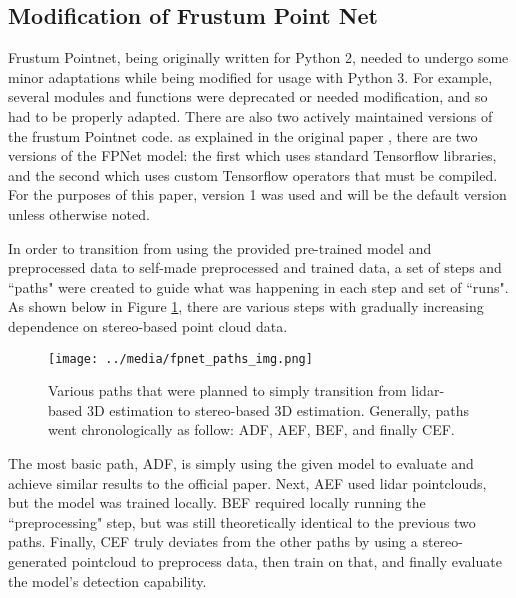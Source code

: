 \subsection{Modification of Frustum Point Net}
Frustum Pointnet, being originally written for Python 2, needed to undergo some minor adaptations while being modified for usage with Python 3. For example, several modules and functions were deprecated or needed modification, and so had to be properly adapted. There are also two actively maintained versions of the frustum Pointnet code. as explained in the original paper \cite{qi_frustum_2017}, there are two versions of the FPNet model: the first which uses standard Tensorflow libraries, and the second which uses custom Tensorflow operators that must be compiled. For the purposes of this paper, version 1 was used and will be the default version unless otherwise noted.

In order to transition from using the provided pre-trained model and preprocessed data to self-made preprocessed and trained data, a set of steps and ``paths" were created to guide what was happening in each step and set of ``runs". As shown below in Figure \ref{fp_paths}, there are various steps with gradually increasing dependence on stereo-based point cloud data.

\begin{figure}[H]
    \centering
    \texttt{[image: ../media/fpnet\_paths\_img.png]}
    \caption{Various paths that were planned to simply transition from lidar-based 3D estimation to stereo-based 3D estimation. Generally, paths went chronologically as follow: ADF, AEF, BEF, and finally CEF.}
    \label{fp_paths}
\end{figure}

The most basic path, ADF, is simply using the given model to evaluate and achieve similar results to the official paper. Next, AEF used lidar pointclouds, but the model was trained locally. BEF required locally running the ``preprocessing" step, but was still theoretically identical to the previous two paths. Finally, CEF truly deviates from the other paths by using a stereo-generated pointcloud to preprocess data, then train on that, and finally evaluate the model's detection capability.

\newpage
